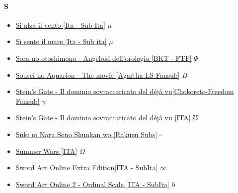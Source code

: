 		\paragraph{S} \hypertarget{FS}{}
			\begin{itemize}
				
				\item \href{https://mega.nz/#!FwoVCKpT!wXVhdgTQGj_YTibBZ4MJtpvsB4q_-rxskduTjisTrtU} {Si alza il vento [Ita - Sub Ita]} $\mu$   \\
				\item \href{https://mega.nz/#!dwRBwQxQ!bTvqPaXlPmVYI-dLPiKwdpJkUT0yk1861vv7WW5Kt9c} {Si sente il mare [Ita - Sub ita]} $\mu$   \\
				\item \href{https://mega.nz/#!9KYWhRiS!pWeI59-INpfKNEN6tIX6Z7ZmjmZ1DVWUwt0opUrpNss} {Sora no otoshimono - Angeloid dell'orologio [BKT - FTF]} $\Psi$   \\
				\item \href{https://mega.nz/#!Zd8VAKID!61w1SYL2HkwGUmOzs8OC_UMrX_uTrTobS8hEpSC3MJU} {Sousei no Aquarion - The movie [Agartha-LS-Fansub]} $B$   \\
				\item \href{https://mega.nz/#!l05ETJDZ!LKyrJbfOaKrRFDtpf3dW1saMCsw2cb8vSb-6qmSFrkg} {Stein's Gate -  Il dominio sovraccaricato del déjà vu[Chokoreto-Freedom Fansub]} $\gamma$   \\
				\item \href{https://mega.nz/#!HjJxnA4a!GTk0MeJATM_S_zjn2a9BpFrYaxvVcoIfn_Lp-cDXerg} {Stein's Gate -  Il dominio sovraccaricato del déjà vu [ITA]} $\mho$   \\
				\item \href{https://mega.nz/#!ek8SXZCL!rVrR2u9eNtYQriwRakMEnO_L-2KA_xRzK8rzi2xKAos} {Suki ni Naru Sono Shunkan wo [Rakuen Subs]} $\square$   \\
				\item \href{https://mega.nz/#!Yn5ElCTS!cBUOwb7oyMkYSPeozaSJ1coiQooMZ--KtH1zyB6oZLU} {Summer Wars [ITA]} $\Omega$   \\
				\item \href{https://mega.nz/#!JOg10JRb!mJzKE9x1SZmCt3vlf5ziREqwG-44L3gb3dwAJ4rgryc} {Sword Art Online Extra Edition[ITA - SubIta]} $\infty$   \\
				\item \href{https://mega.nz/#!GPYUBKzZ!JQqz45F77at3dOtwubuvQZcfAKJeo3MN36DfNMsy_kc} {Sword Art Online 2 - Ordinal Scale [ITA - SubIta]} $\oldstylenums{6}$   \\
			
			\end{itemize}	
		
